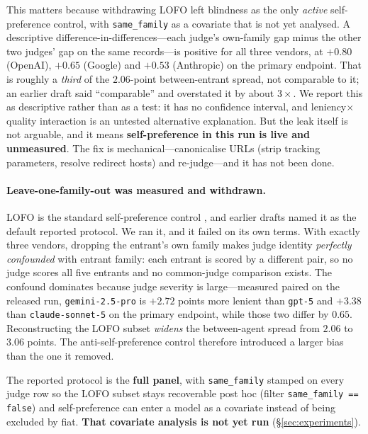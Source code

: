 This matters because withdrawing LOFO left blindness as the only \emph{active} self-preference control, with \texttt{same\_family} as a covariate that is not yet analysed. A descriptive difference-in-differences---each judge's own-family gap minus the other two judges' gap on the same records---is positive for all three vendors, at $+0.80$ (OpenAI), $+0.65$ (Google) and $+0.53$ (Anthropic) on the primary endpoint. That is roughly a \emph{third} of the $2.06$-point between-entrant spread, not comparable to it; an earlier draft said ``comparable'' and overstated it by about $3{\times}$. We report this as descriptive rather than as a test: it has no confidence interval, and leniency${\times}$quality interaction is an untested alternative explanation. But the leak itself is not arguable, and it means \textbf{self-preference in this run is live and unmeasured}. The fix is mechanical---canonicalise URLs (strip tracking parameters, resolve redirect hosts) and re-judge---and it has not been done.

\paragraph{Leave-one-family-out was measured and withdrawn.} LOFO is the standard self-preference control \citep{panickssery2024own,ye2024justice}, and earlier drafts named it as the default reported protocol. We ran it, and it failed on its own terms. With exactly three vendors, dropping the entrant's own family makes judge identity \emph{perfectly confounded} with entrant family: each entrant is scored by a different pair, so no judge scores all five entrants and no common-judge comparison exists. The confound dominates because judge severity is large---measured paired on the released run, \texttt{gemini-2.5-pro} is $+2.72$ points more lenient than \texttt{gpt-5} and $+3.38$ than \texttt{claude-sonnet-5} on the primary endpoint, while those two differ by $0.65$. Reconstructing the LOFO subset \emph{widens} the between-agent spread from $2.06$ to $3.06$ points. The anti-self-preference control therefore introduced a larger bias than the one it removed.

The reported protocol is the \textbf{full panel}, with \texttt{same\_family} stamped on every judge row so the LOFO subset stays recoverable post hoc (filter \texttt{same\_family == false}) and self-preference can enter a model as a covariate instead of being excluded by fiat. \textbf{That covariate analysis is not yet run} (\S\ref{sec:experiments}).

